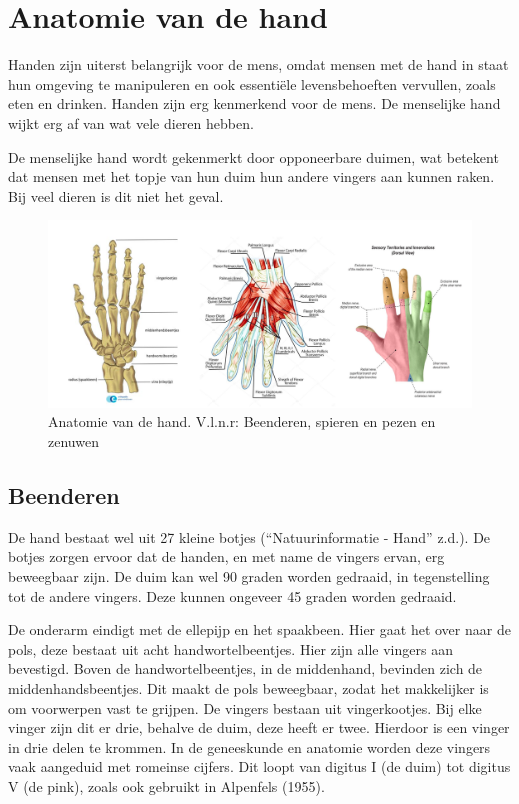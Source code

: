 \hypertarget{anatomie-van-de-hand}{%
\section{Anatomie van de hand}\label{anatomie-van-de-hand}}

Handen zijn uiterst belangrijk voor de mens, omdat mensen met de hand in
staat hun omgeving te manipuleren en ook essentiële levensbehoeften
vervullen, zoals eten en drinken. Handen zijn erg kenmerkend voor de
mens. De menselijke hand wijkt erg af van wat vele dieren hebben.

De menselijke hand wordt gekenmerkt door opponeerbare duimen, wat
betekent dat mensen met het topje van hun duim hun andere vingers aan
kunnen raken. Bij veel dieren is dit niet het geval.

\begin{figure}
\centering
\includegraphics[width=1\textwidth,height=\textheight]{img/anatomie.png}
\caption{Anatomie van de hand. V.l.n.r: Beenderen, spieren en pezen en
zenuwen\label{fig:anatomie}}
\end{figure}

\hypertarget{beenderen}{%
\subsection{Beenderen}\label{beenderen}}

De hand bestaat wel uit 27 kleine botjes (``Natuurinformatie - Hand''
z.d.). De botjes zorgen ervoor dat de handen, en met name de vingers
ervan, erg beweegbaar zijn. De duim kan wel 90 graden worden gedraaid,
in tegenstelling tot de andere vingers. Deze kunnen ongeveer 45 graden
worden gedraaid.

De onderarm eindigt met de ellepijp en het spaakbeen. Hier gaat het over
naar de pols, deze bestaat uit acht handwortelbeentjes. Hier zijn alle
vingers aan bevestigd. Boven de handwortelbeentjes, in de middenhand,
bevinden zich de middenhandsbeentjes. Dit maakt de pols beweegbaar,
zodat het makkelijker is om voorwerpen vast te grijpen. De vingers
bestaan uit vingerkootjes. Bij elke vinger zijn dit er drie, behalve de
duim, deze heeft er twee. Hierdoor is een vinger in drie delen te
krommen. In de geneeskunde en anatomie worden deze vingers vaak
aangeduid met romeinse cijfers. Dit loopt van digitus I (de duim) tot
digitus V (de pink), zoals ook gebruikt in Alpenfels (1955).

